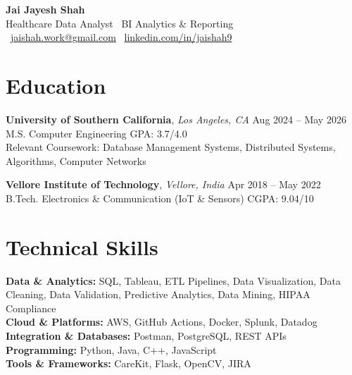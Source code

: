 \documentclass[letterpaper,11pt]{article}
\begin{document}
\begin{center}
    {\LARGE \textbf{Jai Jayesh Shah}}\\
    {\normalsize Healthcare Data Analyst \textbar\ BI Analytics \& Reporting}\\
    \small
    \faEnvelope\ \href{mailto:jaishah.work@gmail.com}{jaishah.work@gmail.com}
    \quad
    \faLinkedin\ \href{https://www.linkedin.com/in/jaishah9}{linkedin.com/in/jaishah9}
\end{center}
\vspace{-13pt}


\section*{Education}
\textbf{University of Southern California}, \textit{Los Angeles, CA} \hfill Aug 2024 -- May 2026 \\
M.S. Computer Engineering \hfill GPA: 3.7/4.0 \\
Relevant Coursework: Database Management Systems, Distributed Systems, Algorithms, Computer Networks

\vspace{4pt}

\textbf{Vellore Institute of Technology}, \textit{Vellore, India }\hfill Apr 2018 -- May 2022 \\
B.Tech. Electronics \& Communication (IoT \& Sensors) \hfill CGPA: 9.04/10


\section*{Technical Skills}
\textbf{Data \& Analytics:} SQL, Tableau, ETL Pipelines, Data Visualization, Data Cleaning, Data Validation, Predictive Analytics, Data Mining, HIPAA Compliance \\
\textbf{Cloud \& Platforms:} AWS, GitHub Actions, Docker, Splunk, Datadog \\
\textbf{Integration \& Databases:} Postman, PostgreSQL, REST APIs \\
\textbf{Programming:} Python, Java, C++, JavaScript \\
\textbf{Tools \& Frameworks:} CareKit, Flask, OpenCV, JIRA


\end{document}

